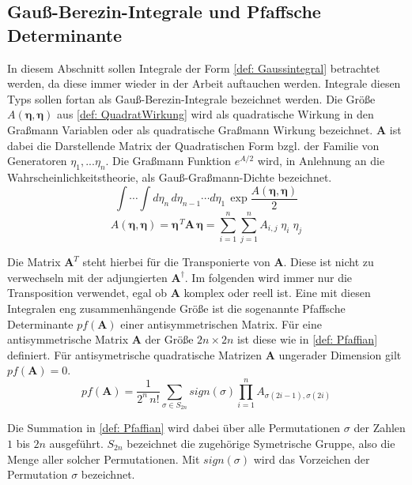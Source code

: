 \subsection{Gauß-Berezin-Integrale und Pfaffsche Determinante}

In diesem Abschnitt sollen Integrale der Form \eqref{def: Gaussintegral} betrachtet werden, da diese immer wieder in der Arbeit auftauchen werden. Integrale diesen Typs sollen fortan als Gauß-Berezin-Integrale bezeichnet werden. Die Größe $A\left(\bm{\eta}, \bm{\eta}\right)$ aus \eqref{def: QuadratWirkung} wird als quadratische Wirkung in den Graßmann Variablen oder als quadratische Graßmann Wirkung bezeichnet. $\bm{A}$ ist dabei die Darstellende Matrix der Quadratischen Form bzgl. der Familie von Generatoren $\eta_1, ... \eta_n$. Die Graßmann Funktion $e^{A/2}$ wird, in Anlehnung an die Wahrscheinlichkeitstheorie, als Gauß-Graßmann-Dichte bezeichnet.   
\begin{equation} \label{def: Gaussintegral}
\int \cdots \int d\eta_n\,d\eta_{n-1}\cdots d\eta_1\, \exp{\frac{A\left(\bm{\eta}, \bm{\eta}\right)}{2}}
\end{equation}
\begin{equation} \label{def: QuadratWirkung}
A\left(\bm{\eta}, \bm{\eta}\right) = \bm{\eta}^{\,T} \bm{A}\, \bm{\eta} = \sum_{i=1}^n \sum_{j=1}^n A_{i,j}\; \eta_i\; \eta_j 
\end{equation}

\noindent Die Matrix $\bm{A}^T$ steht hierbei für die Transponierte von $\bm{A}$. Diese ist nicht zu verwechseln mit der adjungierten $\bm{A}^\dagger$. Im folgenden wird immer nur die Transposition verwendet, egal ob $\bm{A}$ komplex oder reell ist. Eine mit diesen Integralen eng zusammenhängende Größe ist die sogenannte Pfaffsche Determinante $pf(\bm{A})$ einer antisymmetrischen Matrix. Für eine antisymmetrische Matrix $\bm{A}$ der Größe $2n \times 2n$ ist diese wie in \eqref{def: Pfaffian} definiert. Für antisymetrische quadratische Matrizen $\bm{A}$ ungerader Dimension gilt $pf(\bm{A}) = 0$. 
\begin{equation} \label{def: Pfaffian}
pf(\bm{A}) = \frac{1}{2^n\,n!} \sum_{\sigma \in S_{2n}} sign(\sigma) \prod_{i=1}^n A_{\sigma(2i-1),\sigma(2i)} 
\end{equation}

\noindent Die Summation in \eqref{def: Pfaffian} wird dabei über alle Permutationen $\sigma$ der Zahlen $1$ bis $2n$ ausgeführt. $S_{2n}$ bezeichnet die zugehörige Symetrische Gruppe, also die Menge aller solcher Permutationen. Mit $sign(\sigma)$ wird das Vorzeichen der Permutation $\sigma$ bezeichnet. \\

